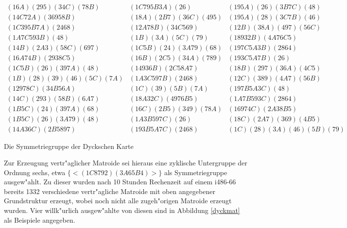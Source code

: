 \begin{table}[p]
{$$\begin{array}{lll}
(16A)(295)(34C)(78B) & (1C795B3A)(26) & (195A)(26)(3B7C)(48)\\
(14C72A)(36958B) & (18A)(2B7)(36C)(495) & (195A)(28)(3C7B)(46)\\
(1C395B7A)(2468) & (12A78B)(34C569) & (12B)(38A)(497)(56C)\\
(1A7C593B)(48) & (1B)(3A)(5C)(79) & (18932B)(4A76C5)\\
(14B)(2A3)(58C)(697) & (1C5B)(24)(3A79)(68) & (197C5A3B)(2864)\\
(16A74B)(2938C5) & (16B)(2C5)(34A)(789) & (193C5A7B)(26)\\
(1C5B)(26)(397A)(48) & (14936B)(2C58A7) & (18B)(297)(36A)(4C5)\\
(1B)(28)(39)(46)(5C)(7A) & (1A3C597B)(2468) & (12C)(389)(4A7)(56B)\\
(12978C)(34B56A) & (1C)(39)(5B)(7A) & (197B5A3C)(48)\\
(14C)(293)(58B)(6A7) & (18A32C)(4976B5) & (1A7B593C)(2864)\\
(1B5C)(24)(397A)(68) & (16C)(2B5)(349)(78A) & (16974C)(2A38B5)\\
(1B5C)(26)(3A79)(48) & (1A3B597C)(26) & (18C)(2A7)(369)(4B5)\\
(14A36C)(2B5897) & (193B5A7C)(2468) & (1C)(28)(3A)(46)(5B)(79)
\end{array}$$}
\caption{Die Symmetriegruppe der Dyckschen Karte}
\label{dyckaut}
\end{table}

Zur Erzeugung vertr"aglicher Matroide sei hieraus eine zyklische
Untergruppe der Ordnung sechs, etwa $\{<(1C8792)(3A65B4)>\}$
als Symmetriegruppe ausgew"ahlt. Zu dieser wurden nach 10 Stunden Rechenzeit
auf einem i486-66 bereits 1332 verschiedene vertr"agliche Matroide mit oben
angegebener Grundstruktur erzeugt, wobei noch nicht alle zugeh"origen
Matroide erzeugt wurden. Vier willk"urlich ausgew"ahlte von diesen sind in
Abbildung \ref{dyckmat} als Beispiele angegeben.

